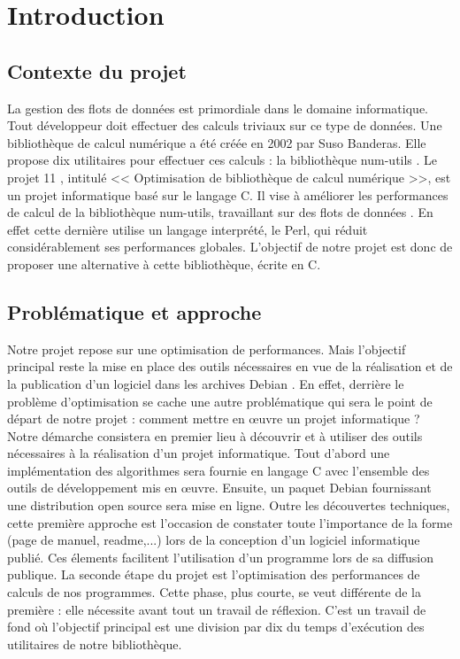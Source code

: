 \chapter{Introduction}
\label{chap:introduction}

\section{Contexte du projet }

La gestion des flots de donn\'ees est primordiale dans le domaine informatique. Tout d\'eveloppeur doit effectuer des calculs triviaux sur ce type de donn\'ees. Une 
biblioth\`eque de calcul num\'erique a \'et\'e cr\'e\'ee en 2002 par Suso Banderas. Elle propose dix utilitaires pour effectuer ces calculs : la biblioth\`eque num-utils \citep{numutils}.
\newline
Le projet 11 \citep{projet11}, intitul\'e << Optimisation de biblioth\`eque de calcul num\'erique >>, est  un projet informatique bas\'e sur le langage C. Il vise \`a 
am\'eliorer les performances de calcul de la biblioth\`eque num-utils, travaillant sur des flots de donn\'ees \citep{dataflux}. En effet cette derni\`ere utilise un langage interpr\'et\'e, le Perl, qui r\'eduit consid\'erablement ses performances globales. 
\newline
L'objectif de notre projet est donc de proposer une alternative \`a cette biblioth\`eque, \'ecrite en C.

\section{Probl\'ematique et approche}

Notre projet repose sur une optimisation de performances. Mais l'objectif principal reste la mise en place des outils n\'ecessaires en vue de la 
r\'ealisation et de la publication d'un logiciel dans les archives Debian \citep{debian}.
En effet, derri\`ere le probl\`eme d'optimisation se cache une autre probl\'ematique qui sera le point de d\'epart de notre projet : comment mettre
en \oe{}uvre un projet informatique ?
Notre d\'emarche consistera en premier lieu \`a d\'ecouvrir et \`a utiliser des outils n\'ecessaires \`a la r\'ealisation d'un projet informatique.
\newline
Tout d'abord une impl\'ementation des algorithmes sera fournie en langage C avec l'ensemble des outils de d\'eveloppement mis en \oe{}uvre. Ensuite, 
un paquet Debian fournissant une distribution open source sera mise en ligne. 
Outre les d\'ecouvertes techniques, cette premi\`ere approche est l'occasion de constater toute l'importance de la forme (page de manuel, readme,...) 
lors de la conception d'un logiciel informatique publi\'e. Ces \'elements facilitent l'utilisation d'un programme lors de sa diffusion publique.
\newline
La seconde \'etape du projet est l'optimisation des performances de calculs de nos programmes. Cette phase, plus courte, se veut diff\'erente de la 
premi\`ere : elle n\'ecessite avant tout un travail de r\'eflexion. C'est  un travail de fond o\`u l'objectif principal est une division par dix du temps
d'ex\'ecution des utilitaires de notre biblioth\`eque.

